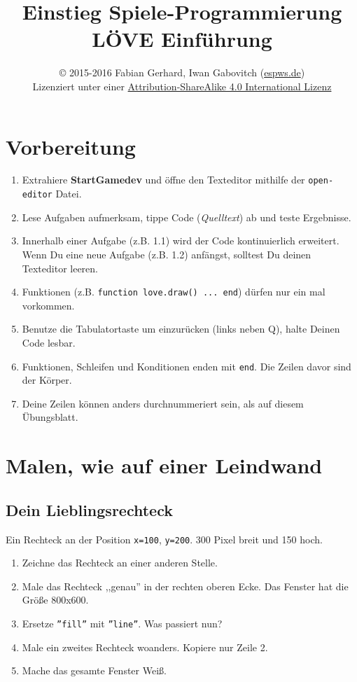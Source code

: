 \documentclass[a4paper, 11pt]{article}
\date{\vspace{-5ex}}
\title{\vspace{-8ex}Einstieg Spiele-Programmierung LÖVE Einführung\vspace{-1ex}}
\author{\copyright{} 2015-2016 Fabian Gerhard, Iwan Gabovitch (\href{http://espws.de}{espws.de})\\
Lizenziert unter einer \href{http://creativecommons.org/licenses/by-sa/4.0/}{Attribution-ShareAlike 4.0 International Lizenz}}
\begin{document}
\maketitle
\thispagestyle{fancy} %

\section{Vorbereitung}

\begin{enumerate}
  \item Extrahiere \textbf{StartGamedev} und öffne den Texteditor mithilfe der \texttt{open-editor} Datei.
  \item Lese Aufgaben aufmerksam, tippe Code (\textit{Quelltext}) ab und teste Ergebnisse.
  \item Innerhalb einer Aufgabe (z.B. 1.1) wird der Code kontinuierlich erweitert. Wenn Du eine neue Aufgabe (z.B. 1.2) anfängst, solltest Du deinen Texteditor leeren.
  \item Funktionen (z.B. \texttt{function love.draw() ... end}) dürfen nur ein mal vorkommen.
  \item Benutze die Tabulatortaste um einzurücken (links neben Q), halte Deinen Code lesbar.
  \item Funktionen, Schleifen und Konditionen enden mit \texttt{\texttt{end}}. Die Zeilen davor sind der Körper.
  \item Deine Zeilen können anders durchnummeriert sein, als auf diesem Übungsblatt.
\end{enumerate}

\section{Malen, wie auf einer Leindwand}

\subsection{Dein Lieblingsrechteck}

Ein Rechteck an der Position \texttt{x=100}, \texttt{y=200}. 300 Pixel breit und 150 hoch.


\begin{enumerate}
\item Zeichne das Rechteck an einer anderen Stelle.
\item Male das Rechteck ,,genau'' in der rechten oberen Ecke. Das Fenster hat die Größe 800x600.
\item Ersetze \texttt{''fill''} mit \texttt{''line''}. Was passiert nun?
\item Male ein zweites Rechteck woanders. Kopiere nur Zeile 2.
\item Mache das gesamte Fenster Weiß.
\end{enumerate}
\end{document}
